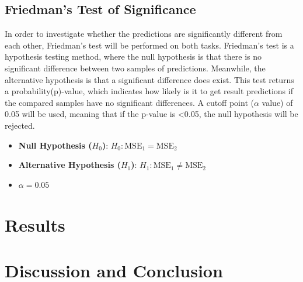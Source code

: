 \documentclass[10.7pt, twocolumn]{article}
\begin{document}
\subsection{Friedman's Test of Significance}
In order to investigate whether the predictions are significantly different from each other, Friedman's test will be performed on both tasks. Friedman's test is a hypothesis testing method, where the null hypothesis is that there is no significant difference between two samples of predictions\cite{HOFFMAN2015421}. Meanwhile, the alternative hypothesis is that a significant difference does exist. This test returns a probability(p)-value, which indicates how likely is it to get result predictions if the compared samples have no significant differences. A cutoff point ($\alpha$ value) of 0.05 will be used, meaning that if the p-value is <0.05, the null hypothesis will be rejected.

\begin{itemize}
  \item \textbf{Null Hypothesis (\(H_0\))}: \(H_0: \text{MSE}_1 = \text{MSE}_2\)
  \item \textbf{Alternative Hypothesis (\(H_1\))}: \(H_1: \text{MSE}_1 \neq \text{MSE}_2\)
  \item \( \alpha = 0.05 \)
\end{itemize}
\section{Results}\label{results}

\section{Discussion and Conclusion}\label{discussion and conclusion}



\end{document}
